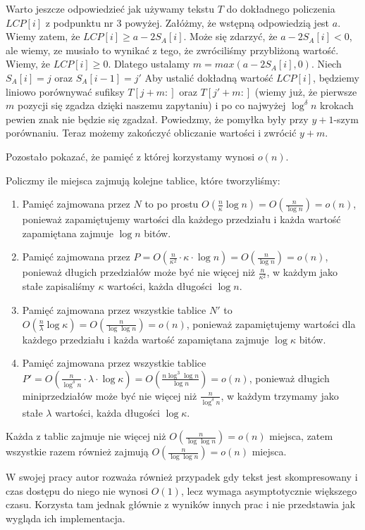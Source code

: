 \documentclass{article}
\begin{document}
Warto jeszcze odpowiedzieć jak używamy tekstu $T$ do dokładnego policzenia $LCP[i]$ z podpunktu nr 3 powyżej. Załóżmy, że wstępną odpowiedzią jest $a$. Wiemy zatem, że $LCP[i] \ge a - 2S_A[i]$. Może się zdarzyć, że $a - 2S_A[i] < 0$, ale wiemy, ze musiało to wynikać z tego, że zwróciliśmy przybliżoną wartość. Wiemy, że $LCP[i] \ge 0$. Dlatego ustalamy $m = max(a - 2S_A[i], 0)$. Niech $S_A[i] = j$ oraz $S_A[i - 1] = j'$ Aby ustalić dokładną wartość $LCP[i]$, będziemy liniowo porównywać sufiksy $T[j+m:]$ oraz $T[j'+m:]$ (wiemy już, że pierwsze $m$ pozycji się zgadza dzięki naszemu zapytaniu) i po co najwyżej $\log^{\delta}{n}$ krokach pewien znak nie będzie się zgadzał. Powiedzmy, że pomyłka były przy $y+1$-szym porównaniu. Teraz możemy zakończyć obliczanie wartości i zwrócić $y+m$.

Pozostało pokazać, że pamięć z której korzystamy wynosi $o(n)$.

Policzmy ile miejsca zajmują kolejne tablice, które tworzyliśmy:
\begin{enumerate}
    \item Pamięć zajmowana przez $N$ to po prostu $O(\frac{n}{\kappa}\log{n}) = O(\frac{n}{\log{n}}) = o(n)$, ponieważ zapamiętujemy wartości dla każdego przedziału i każda wartość zapamiętana zajmuje $\log{n}$ bitów.
    \item Pamięć zajmowana przez $P = O(\frac{n}{\kappa^2} \cdot \kappa \cdot \log{n}) = O(\frac{n}{\log{n}}) = o(n)$, ponieważ długich przedziałów może być nie więcej niż $\frac{n}{\kappa^2}$, w każdym jako stałe zapisaliśmy $\kappa$ wartości, każda długości $\log{n}$.
    \item Pamięć zajmowana przez wszystkie tablice $N'$ to $O(\frac{n}{\lambda}\log{\kappa}) = O(\frac{n}{\log{\log{n}}}) = o(n)$, ponieważ zapamiętujemy wartości dla każdego przedziału i każda wartość zapamiętana zajmuje $\log{\kappa}$ bitów.
    \item Pamięć zajmowana przez wszystkie tablice $P' = O(\frac{n}{\log^{\delta}{n}} \cdot \lambda \cdot \log{\kappa}) = O(\frac{n \log^3{\log{n}}}{\log{n}}) = o(n)$, ponieważ długich miniprzedziałów może być nie więcej niż $\frac{n}{\log^{\delta}{n}}$, w każdym trzymamy jako stałe $\lambda$ wartości, każda długości $\log{\kappa}$.
\end{enumerate}

Każda z tablic zajmuje nie więcej niż $O(\frac{n}{\log{\log{n}}}) = o(n)$ miejsca, zatem wszystkie razem również zajmują $O(\frac{n}{\log{\log{n}}}) = o(n)$ miejsca.

W swojej pracy autor rozważa również przypadek gdy tekst jest skompresowany i czas dostępu do niego nie wynosi $O(1)$, lecz wymaga asymptotycznie większego czasu. Korzysta tam jednak głównie z wyników innych prac i nie przedstawia jak wygląda ich implementacja.
\end{document}

